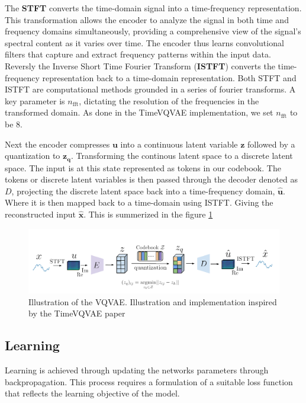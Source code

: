 The \textbf{STFT} converts the time-domain signal into a time-frequency representation. This transformation allows the encoder to analyze the signal in both time and frequency domains simultaneously, providing a comprehensive view of the signal's spectral content as it varies over time. 
The encoder thus learns convolutional filters that capture and extract frequency patterns within the input data.
Reversly the Inverse Short Time Fourier Transform (\textbf{ISTFT}) converts the time-frequency representation back to a time-domain representation. 
Both STFT and ISTFT are computational methods grounded in a series of fourier transforms. A key parameter is $n_{\text{fft}}$, dictating the resolution of the frequencies in the transformed domain.
As done in the TimeVQVAE implementation, we set $n_{\text{fft}}$ to be 8.

Next the encoder compresses $\mathbf{u}$ into a continuous latent variable $\mathbf{z}$ followed by a quantization to $\mathbf{z_q}$. Transforming the continous latent space to a discrete latent space. The input is at this state represented as tokens in our codebook.
The tokens or discrete latent variables is then passed through the decoder denoted as $D$, projecting the discrete latent space back into a time-frequency domain, $\hat{\mathbf{u}}$. Where it is then mapped back to a time-domain using ISTFT.
Giving the reconstructed input $\mathbf{\hat{x}}$. This is summerized in the figure \ref{fig:VQVAE}

\begin{center}
\begin{figure}[H]
    \includegraphics[scale=0.8]{figures/figure-pdf/VQVAE.pdf}
    \caption{ Illustration of the VQVAE. Illustration and implementation inspired by the TimeVQVAE paper\cite{lee2023masked} }
    \label{fig:VQVAE}
\end{figure}
\end{center}

\subsection{Learning}
Learning is achieved through updating the networks parameters through backpropagation. This process requires a formulation of a suitable loss function that reflects the learning objective of the model.

